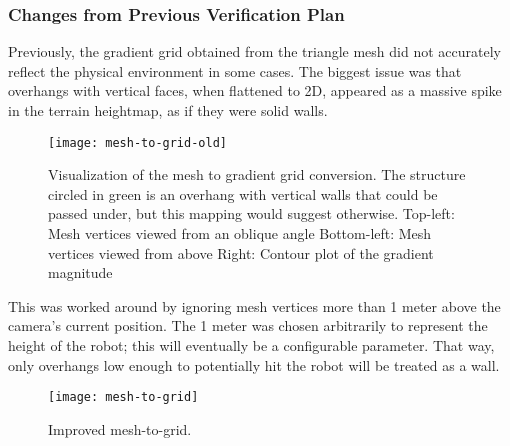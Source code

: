 \subsubsection{Changes from Previous Verification Plan}\label{subsubsec:changes-to-plan}
Previously, the gradient grid obtained from the triangle mesh did not accurately reflect the physical environment in
some cases.
The biggest issue was that overhangs with vertical faces, when flattened to 2D, appeared as a massive spike in the
terrain heightmap, as if they were solid walls.

\begin{figure}
    \centering
    \texttt{[image: mesh-to-grid-old]}
    \caption{
        Visualization of the mesh to gradient grid conversion. The structure circled in green is an overhang with vertical walls that could be passed under, but this mapping would suggest otherwise.\linebreak
        Top-left: Mesh vertices viewed from an oblique angle\linebreak
        Bottom-left: Mesh vertices viewed from above\linebreak
        Right: Contour plot of the gradient magnitude
    }
\end{figure}

This was worked around by ignoring mesh vertices more than 1 meter above the camera's current position.
The 1 meter was chosen arbitrarily to represent the height of the robot; this will eventually be a configurable
parameter.
That way, only overhangs low enough to potentially hit the robot will be treated as a wall.

\begin{figure}
    \centering
    \texttt{[image: mesh-to-grid]}
    \caption{Improved mesh-to-grid.}
\end{figure}